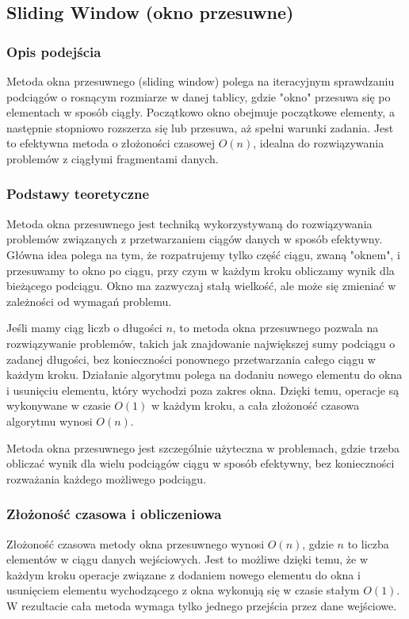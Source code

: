 \documentclass[12pt,twoside]{article}
\begin{document}
\subsection{Sliding Window (okno przesuwne)}
\subsubsection{Opis podejścia}

Metoda okna przesuwnego (sliding window) polega na iteracyjnym sprawdzaniu podciągów o rosnącym rozmiarze w danej tablicy, gdzie "okno" przesuwa się po elementach w sposób ciągły. Początkowo okno obejmuje początkowe elementy, a następnie stopniowo rozszerza się lub przesuwa, aż spełni warunki zadania. Jest to efektywna metoda o złożoności czasowej $O(n)$, idealna do rozwiązywania problemów z ciągłymi fragmentami danych.

\subsubsection{Podstawy teoretyczne}

Metoda okna przesuwnego jest techniką wykorzystywaną do rozwiązywania problemów związanych z przetwarzaniem ciągów danych w sposób efektywny. Główna idea polega na tym, że rozpatrujemy tylko część ciągu, zwaną "oknem", i przesuwamy to okno po ciągu, przy czym w każdym kroku obliczamy wynik dla bieżącego podciągu. Okno ma zazwyczaj stałą wielkość, ale może się zmieniać w zależności od wymagań problemu.

Jeśli mamy ciąg liczb o długości $n$, to metoda okna przesuwnego pozwala na rozwiązywanie problemów, takich jak znajdowanie największej sumy podciągu o zadanej długości, bez konieczności ponownego przetwarzania całego ciągu w każdym kroku. Działanie algorytmu polega na dodaniu nowego elementu do okna i usunięciu elementu, który wychodzi poza zakres okna. Dzięki temu, operacje są wykonywane w czasie $O(1)$ w każdym kroku, a cała złożoność czasowa algorytmu wynosi $O(n)$.

Metoda okna przesuwnego jest szczególnie użyteczna w problemach, gdzie trzeba obliczać wynik dla wielu podciągów ciągu w sposób efektywny, bez konieczności rozważania każdego możliwego podciągu.

\subsubsection{Złożoność czasowa i obliczeniowa}

Złożoność czasowa metody okna przesuwnego wynosi $O(n)$, gdzie $n$ to liczba elementów w ciągu danych wejściowych. Jest to możliwe dzięki temu, że w każdym kroku operacje związane z dodaniem nowego elementu do okna i usunięciem elementu wychodzącego z okna wykonują się w czasie stałym $O(1)$. W rezultacie cała metoda wymaga tylko jednego przejścia przez dane wejściowe.
\end{document}
